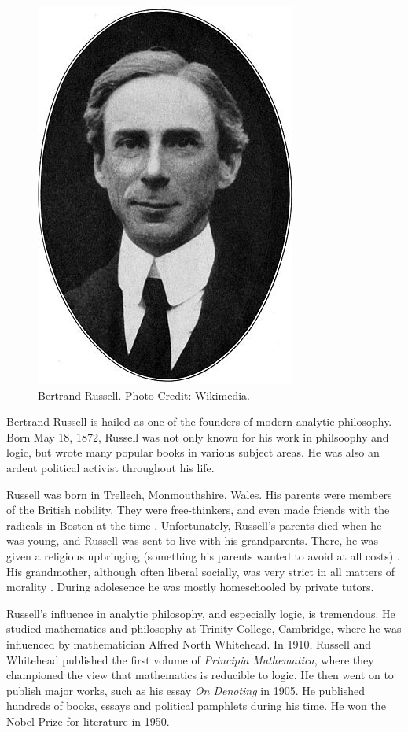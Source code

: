 \documentclass[../../../include/open-logic-section]{subfiles}
\begin{document}


\begin{figure}[h!] 
\centering
\includegraphics[scale=0.4]{bertrand-russell.jpg}
 \caption{Bertrand Russell. Photo Credit: Wikimedia.} 
\end{figure} 

Bertrand Russell is hailed
as one of the founders of modern analytic philosophy. Born May 18, 1872,
Russell was not only known for his work in philsoophy and logic, but wrote
many popular books in various subject areas. He was also an ardent
political activist throughout his life.

Russell was born in Trellech, Monmouthshire, Wales. His parents were
members of the British nobility. They were free-thinkers, and even made
friends with the radicals in Boston at the time \cite[9]{Russell1967}.
Unfortunately, Russell's parents died when he was young, and Russell was
sent to live with his grandparents. There, he was given a religious
upbringing (something his parents wanted to avoid at all costs)
\citep[11]{Russell1967}. His grandmother, although often liberal socially,
was very strict in all matters of morality \citep[15]{Russell1967}. During
adolesence he was mostly homeschooled by private tutors.

Russell's influence in analytic philosophy, and especially logic, is
tremendous. He studied mathematics and philosophy at Trinity College,
Cambridge, where he was influenced by mathematician Alfred North Whitehead.
In 1910, Russell and Whitehead published the first volume of
\emph{Principia Mathematica}, where they championed the view that
mathematics is reducible to logic. He then went on to publish major works,
such as his essay \emph{On Denoting} in 1905. He published 
hundreds of books, essays and political pamphlets during his time. He won
the Nobel Prize for literature in 1950.
\end{document}
